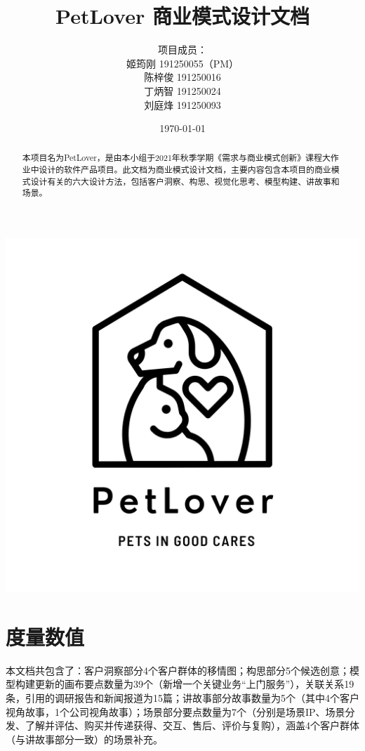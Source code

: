 \documentclass[a4paper]{ctexart}
\title{\Huge PetLover 商业模式设计文档}
\author{
  项目成员：\\
  姬筠刚 191250055（PM）\\
  陈梓俊 191250016\\
  丁炳智 191250024\\
  刘庭烽 191250093\\
}
\date{\today}
\begin{document}
\maketitle

\centerline{\includegraphics[]{logo.png}}

\newpage

\begin{abstract}
  本项目名为PetLover，是由本小组于2021年秋季学期《需求与商业模式创新》课程大作业中设计的软件产品项目。此文档为商业模式设计文档，主要内容包含本项目的商业模式设计有关的六大设计方法，包括客户洞察、构思、视觉化思考、模型构建、讲故事和场景。
\end{abstract}



\tableofcontents

\newpage

\setlength{\parskip}{1em}


\section{度量数值}

本文档共包含了：客户洞察部分4个客户群体的移情图；构思部分5个候选创意；模型构建更新的画布要点数量为39个（新增一个关键业务“上门服务”），关联关系19条，引用的调研报告和新闻报道为15篇；讲故事部分故事数量为5个（其中4个客户视角故事，1个公司视角故事）；场景部分要点数量为7个（分别是场景IP、场景分发、了解并评估、购买并传递获得、交互、售后、评价与复购），涵盖4个客户群体（与讲故事部分一致）的场景补充。
\end{document}
